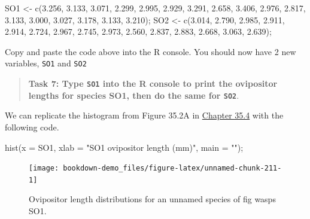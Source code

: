 \documentclass[
]{scrbook}
\newenvironment{Shaded}{\begin{snugshade}}{\end{snugshade}}
\newcommand{\AttributeTok}[1]{\textcolor[rgb]{0.77,0.63,0.00}{#1}}
\newcommand{\FloatTok}[1]{\textcolor[rgb]{0.00,0.00,0.81}{#1}}
\newcommand{\FunctionTok}[1]{\textcolor[rgb]{0.00,0.00,0.00}{#1}}
\newcommand{\NormalTok}[1]{#1}
\newcommand{\OtherTok}[1]{\textcolor[rgb]{0.56,0.35,0.01}{#1}}
\newcommand{\StringTok}[1]{\textcolor[rgb]{0.31,0.60,0.02}{#1}}
\begin{document}
\begin{Shaded}
\begin{Highlighting}[]
\NormalTok{SO1 }\OtherTok{\textless{}{-}} \FunctionTok{c}\NormalTok{(}\FloatTok{3.256}\NormalTok{, }\FloatTok{3.133}\NormalTok{, }\FloatTok{3.071}\NormalTok{, }\FloatTok{2.299}\NormalTok{, }\FloatTok{2.995}\NormalTok{, }\FloatTok{2.929}\NormalTok{, }\FloatTok{3.291}\NormalTok{, }\FloatTok{2.658}\NormalTok{, }\FloatTok{3.406}\NormalTok{, }
         \FloatTok{2.976}\NormalTok{, }\FloatTok{2.817}\NormalTok{, }\FloatTok{3.133}\NormalTok{, }\FloatTok{3.000}\NormalTok{, }\FloatTok{3.027}\NormalTok{, }\FloatTok{3.178}\NormalTok{, }\FloatTok{3.133}\NormalTok{, }\FloatTok{3.210}\NormalTok{);}
\NormalTok{SO2 }\OtherTok{\textless{}{-}} \FunctionTok{c}\NormalTok{(}\FloatTok{3.014}\NormalTok{, }\FloatTok{2.790}\NormalTok{, }\FloatTok{2.985}\NormalTok{, }\FloatTok{2.911}\NormalTok{, }\FloatTok{2.914}\NormalTok{, }\FloatTok{2.724}\NormalTok{, }\FloatTok{2.967}\NormalTok{, }\FloatTok{2.745}\NormalTok{, }\FloatTok{2.973}\NormalTok{, }
         \FloatTok{2.560}\NormalTok{, }\FloatTok{2.837}\NormalTok{, }\FloatTok{2.883}\NormalTok{, }\FloatTok{2.668}\NormalTok{, }\FloatTok{3.063}\NormalTok{, }\FloatTok{2.639}\NormalTok{);}
\end{Highlighting}
\end{Shaded}

Copy and paste the code above into the R console.
You should now have 2 new variables, \texttt{SO1} and \texttt{SO2}

\begin{quote}
\textbf{Task 7: Type \texttt{SO1} into the R console to print the ovipositor lengths for species SO1, then do the same for \texttt{SO2}}.
\end{quote}

We can replicate the histogram from Figure 35.2A in \protect\hyperlink{randomisation-for-hypothesis-testing}{Chapter 35.4} with the following code.

\begin{Shaded}
\begin{Highlighting}[]
\FunctionTok{hist}\NormalTok{(}\AttributeTok{x =}\NormalTok{ SO1, }\AttributeTok{xlab =} \StringTok{"SO1 ovipositor length (mm)"}\NormalTok{, }\AttributeTok{main =} \StringTok{""}\NormalTok{);}
\end{Highlighting}
\end{Shaded}

\begin{figure}
\texttt{[image: bookdown-demo\_files/figure-latex/unnamed-chunk-211-1]} \caption{Ovipositor length distributions for an unnamed species of fig wasps SO1.}\label{fig:unnamed-chunk-211}
\end{figure}
\end{document}
